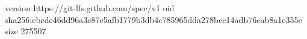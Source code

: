 version https://git-lfs.github.com/spec/v1
oid sha256:cbcde46dd96a3c87e5afb1779b3db4c785965dda278bec14adb76eab8a1e355c
size 275507

